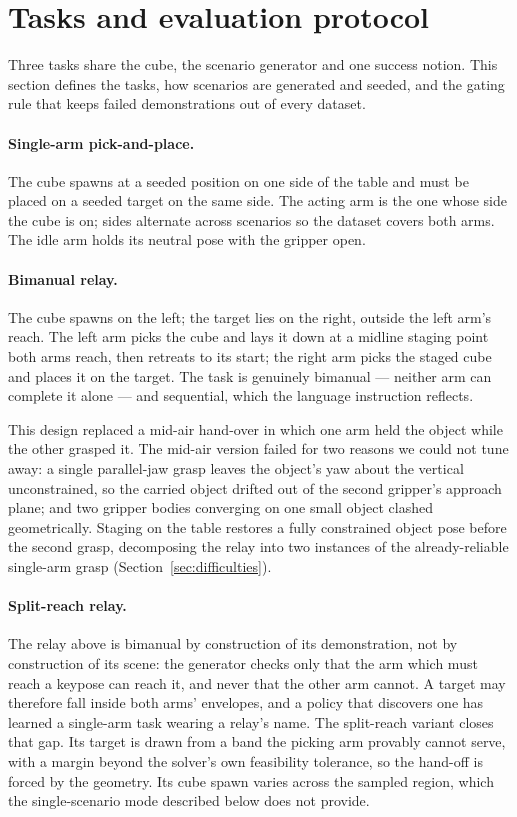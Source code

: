 \section{Tasks and evaluation protocol}
\label{sec:tasks}

Three tasks share the cube, the scenario generator and one success notion.
This section defines the tasks, how scenarios are generated and seeded,
and the gating rule that keeps failed demonstrations out of every
dataset.

\paragraph{Single-arm pick-and-place.}
The cube spawns at a seeded position on one side of the table and must
be placed on a seeded target on the same side. The acting arm is the one
whose side the cube is on; sides alternate across scenarios so the
dataset covers both arms. The idle arm holds its neutral pose with the
gripper open.

\paragraph{Bimanual relay.}
The cube spawns on the left; the target lies on the right, outside the
left arm's reach. The left arm picks the cube and lays it down at a
midline staging point both arms reach, then retreats to its start; the
right arm picks the staged cube and places it on the target. The task is
genuinely bimanual --- neither arm can complete it alone --- and
sequential, which the language instruction reflects.

This design replaced a mid-air hand-over in which one arm held the
object while the other grasped it. The mid-air version failed for two
reasons we could not tune away: a single parallel-jaw grasp leaves the
object's yaw about the vertical unconstrained, so the carried object
drifted out of the second gripper's approach plane; and two gripper
bodies converging on one small object clashed geometrically. Staging on
the table restores a fully constrained object pose before the second
grasp, decomposing the relay into two instances of the already-reliable
single-arm grasp (Section~\ref{sec:difficulties}).

\paragraph{Split-reach relay.}
The relay above is bimanual by construction of its demonstration, not by
construction of its scene: the generator checks only that the arm which
must reach a keypose can reach it, and never that the other arm cannot.
A target may therefore fall inside both arms' envelopes, and a policy
that discovers one has learned a single-arm task wearing a relay's name.
The split-reach variant closes that gap. Its target is drawn from a band
the picking arm provably cannot serve, with a margin beyond the
solver's own feasibility tolerance, so the hand-off is forced by the
geometry. Its cube spawn varies across the sampled region, which the
single-scenario mode described below does not provide.

